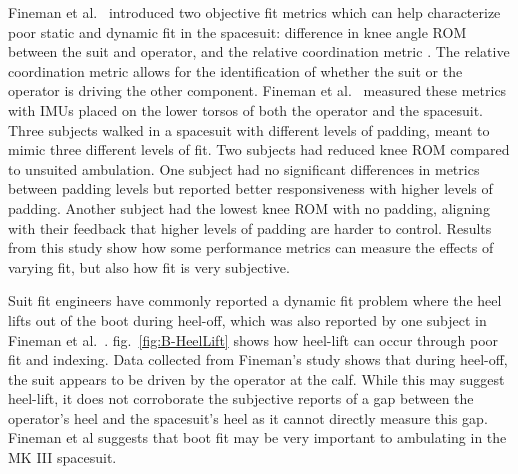\documentclass[defaultstyle,11pt]{comps}
\begin{document}
Fineman et al.~\citep{Fineman2018} introduced two objective fit metrics which can help characterize poor static and dynamic fit in the spacesuit: difference in knee angle ROM between the suit and operator, and the relative coordination metric \citep{Fineman2017a}.
The relative coordination metric allows for the identification of whether the suit or the operator is driving the other component.
Fineman et al.~\citep{Fineman2018} measured these metrics with IMUs placed on the lower torsos of both the operator and the spacesuit.
Three subjects walked in a spacesuit with different levels of padding, meant to mimic three different levels of fit.
Two subjects had reduced knee ROM compared to unsuited ambulation.
One subject had no significant differences in metrics between padding levels but reported better responsiveness with higher levels of padding.
Another subject had the lowest knee ROM with no padding, aligning with their feedback that higher levels of padding are harder to control.
Results from this study show how some performance metrics can measure the effects of varying fit, but also how fit is very subjective.

Suit fit engineers have commonly reported a dynamic fit problem where the heel lifts out of the boot during heel-off, which was also reported by one subject in Fineman et al.~\citep{Fineman2018}.
fig.~\ref{fig:B-HeelLift} shows how heel-lift can occur through poor fit and indexing.
Data collected from Fineman's study shows that during heel-off, the suit appears to be driven by the operator at the calf.
While this may suggest heel-lift, it does not corroborate the subjective reports of a gap between the operator's heel and the spacesuit's heel as it cannot directly measure this gap.
Fineman et al \citep{Fineman2018} suggests that boot fit may be very important to ambulating in the MK III spacesuit.
\end{document}

